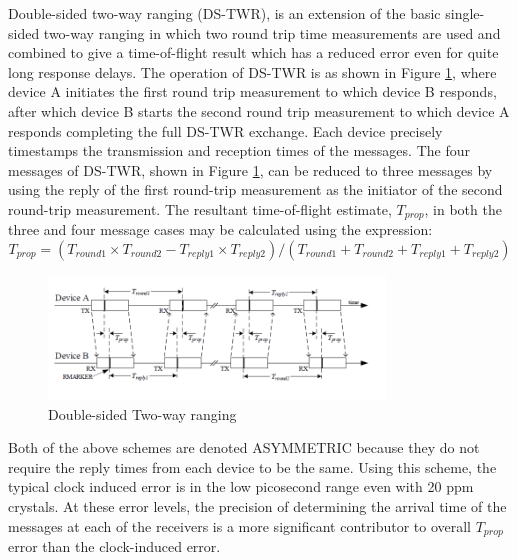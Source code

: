 Double-sided two-way ranging (DS-TWR), is an extension of the basic single-sided two-way ranging in which two round trip time measurements are used and combined to give a time-of-flight result which has a reduced error even for quite long response delays.  The operation of DS-TWR is as shown in Figure \ref{fig:Double-sided Two-way ranging}, where device A initiates the first round trip measurement to which device B responds, after which device B starts the second round trip measurement to which device A responds completing the full DS-TWR exchange.  Each device precisely timestamps the transmission and reception times of the messages. The four messages of DS-TWR, shown in Figure \ref{fig:Double-sided Two-way ranging}, can be reduced to three messages by using the reply of the first round-trip measurement as the initiator of the second round-trip measurement. The resultant time-of-flight estimate, $T_{prop}$, in both the three and four message cases may be calculated using the expression: 
\begin{equation}
T_{prop}=(T_{round1} \times T_{round2}-T_{reply1} \times T_{reply2})/(T_{round1}+T_{round2}+T_{reply1}+T_{reply2})
\end{equation}



\begin{figure}[h!]
    \includegraphics[width=0.8\textwidth]{figures/DSTWR.png}
    \centering
    \caption[Double-sided Two-way ranging]{Double-sided Two-way ranging \protect\cite{DW1000UserManual}}
    \label{fig:Double-sided Two-way ranging}    
\end{figure}

Both of the above schemes are denoted ASYMMETRIC because they do not require the reply times from each device to be the same.   
Using this scheme, the typical clock induced error is in the low picosecond range even with 20 ppm crystals. At these error levels, the precision of determining the arrival time of the messages at each of the receivers is a more significant contributor to overall $T_{prop}$ error than the clock-induced error. 


